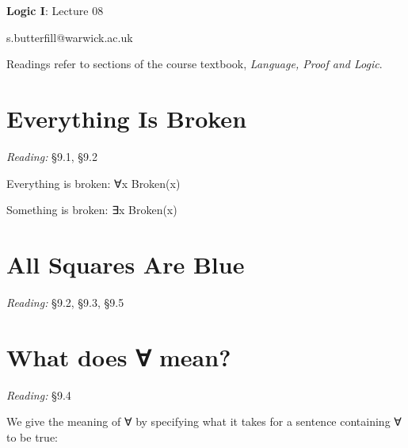 \documentclass[12pt]{extarticle}
\date{}
\makeatletter
\def \ititle {Origins of Mind}
\def \isubtitle {Lecture 08}
\def \iemail{s.butterfill@warwick.ac.uk}
\makeatother
\begin{document}

\begin{multicols*}{3}

\setlength\footnotesep{1em}









\def \ititle {Logic I}
 
\def \isubtitle {Lecture 08}
 
\begin{center}
 
{\Large
 
\textbf{\ititle}: \isubtitle
 
}
 
 
 
\iemail %
 
\end{center}
 
Readings refer to sections of the course textbook, \emph{Language, Proof and Logic}.
 
 
 
\section{Everything Is Broken}
 
\emph{Reading:} §9.1, §9.2
 
Everything is broken: ∀x Broken(x)
 
Something is broken: ∃x Broken(x)
 
 
 
\section{All Squares Are Blue}
 
\emph{Reading:} §9.2, §9.3, §9.5
 
 
 
\section{What does ∀ mean?}
 
\emph{Reading:} §9.4
 
We give the meaning of ∀ by specifying what it takes for a sentence containing ∀ to be true:
 

\end{multicols*}
\end{document}
